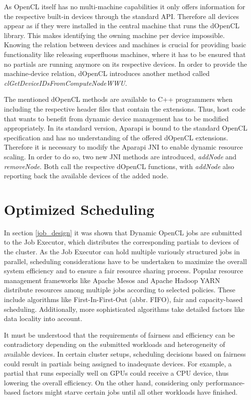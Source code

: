 As OpenCL itself has no multi-machine capabilities it only offers information for the respective built-in devices through the standard API. Therefore all devices appear as if they were installed in the central machine that runs the dOpenCL library. This makes identifying the owning machine per device impossible. Knowing the relation between devices and machines is crucial for providing basic functionality like releasing superfluous machines, where it has to be ensured that no partials are running anymore on its respective devices. In order to provide the machine-device relation, dOpenCL introduces another method called \textit{clGetDeviceIDsFromComputeNodeWWU}.

The mentioned dOpenCL methods are available to C++ programmers when including the respective header files that contain the extensions. Thus, host code that wants to benefit from dynamic device management has to be modified appropriately. In its standard version, Aparapi is bound to the standard OpenCL specification and has no understanding of the offered dOpenCL extensions. Therefore it is necessary to modify the Aparapi JNI to enable dynamic resource scaling. In order to do so, two new JNI methods are introduced, \textit{addNode} and \textit{removeNode}. Both call the respective dOpenCL functions, with \textit{addNode} also reporting back the available devices of the added node.

\section{Optimized Scheduling}
\label{optimized_scheduling}
In section \ref{job_design} it was shown that Dynamic OpenCL jobs are submitted to the Job Executor, which distributes the corresponding partials to devices of the cluster. As the Job Executor can hold multiple variously structured jobs in parallel, scheduling considerations have to be undertaken to maximize the overall system efficiency and to ensure a fair resource sharing process. Popular resource management frameworks like Apache Mesos and Apache Hadoop YARN distribute resources among multiple jobs according to selected policies\cite{mesos}\cite{yarn_paper}. These include algorithms like First-In-First-Out (abbr. FIFO), fair and capacity-based scheduling. Additionally, more sophisticated algorithms take detailed factors like data locality into account.

It must be understood that the requirements of fairness and efficiency can be contradictory depending on the submitted workloads and heterogeneity of available devices. In certain cluster setups, scheduling decisions based on fairness could result in partials being assigned to inadequate devices. For example, a partial that runs especially well on GPUs could receive a CPU device, thus lowering the overall efficiency. On the other hand, considering only performance-based factors might starve certain jobs until all other workloads have finished.

